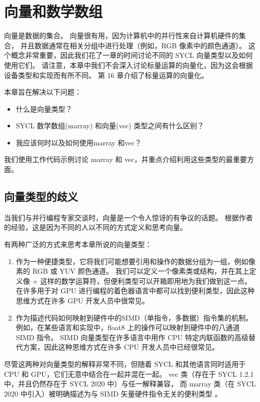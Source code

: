 \section{向量和数学数组}
向量是数据的集合。 向量很有用，因为计算机中的并行性来自计算机硬件的集合，
并且数据通常在相关分组中进行处理（例如，RGB 像素中的颜色通道）。 
这个概念非常重要，因此我们花了一章的时间讨论不同的 SYCL 向量类型以及如何使用它们。 
请注意，本章中我们不会深入讨论标量运算的向量化，因为这会根据设备类型和实现而有所不同。 第 16 章介绍了标量运算的向量化。

本章旨在解决以下问题：

\begin{itemize}
	\item 什么是向量类型？

	\item SYCL 数学数组(marray) 和向量(vec) 类型之间有什么区别？

	\item 我应该何时以及如何使用marray 和vec？
\end{itemize}

我们使用工作代码示例讨论 marray 和 vec，并重点介绍利用这些类型的最重要方面。

\subsection{向量类型的歧义}
当我们与并行编程专家交谈时，向量是一个令人惊讶的有争议的话题。 
根据作者的经验，这是因为不同的人以不同的方式定义和思考向量。

有两种广泛的方式来思考本章所说的向量类型：

\begin{enumerate}
	\item 作为一种便捷类型，它将我们可能想要引用和操作的数据分组为一组，例如像素的 RGB 或 YUV 颜色通道。 
	我们可以定义一个像素类或结构，并在其上定义像 + 这样的数学运算符，但便利类型可以开箱即用地为我们做到这一点。 
	在许多用于对 GPU 进行编程的着色器语言中都可以找到便利类型，因此这种思维方式在许多 GPU 开发人员中很常见。

	\item 作为描述代码如何映射到硬件中的SIMD（单指令，多数据）指令集的机制。 
	例如，在某些语言和实现中，float8 上的操作可以映射到硬件中的八通道 SIMD 指令。 
	SIMD 向量类型在许多语言中用作 CPU 特定内联函数的高级替代方案，因此这种思维方式在许多 CPU 开发人员中已经很常见。
\end{enumerate}

尽管这两种对向量类型的解释非常不同，但随着 SYCL 和其他语言同时适用于 CPU 和 GPU，它们无意中结合在一起并混在一起。 
vec 类（存在于 SYCL 1.2.1 中，并且仍然存在于 SYCL 2020 中）与任一解释兼容，
而 marray 类（在 SYCL 2020 中引入）被明确描述为与 SIMD 矢量硬件指令无关的便利类型 。

